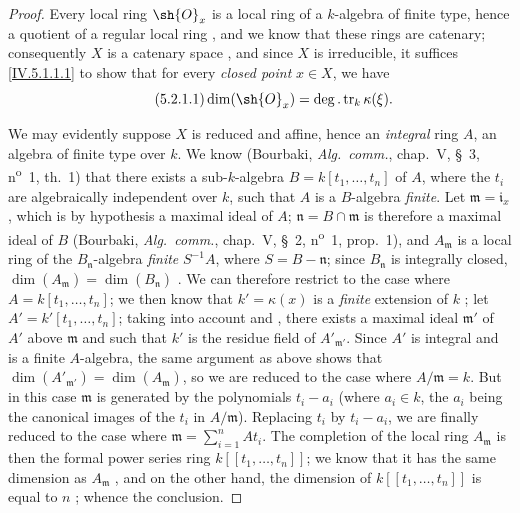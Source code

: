 \begin{proof}
Every local ring $\sh{O}_x$ is a local ring of a $k$-algebra of finite type, hence a quotient of a regular local ring , and we know  that these rings are catenary; consequently $X$ is a catenary space , and since $X$ is irreducible, it suffices \eqref{IV.5.1.1.1} to show that for every \emph{closed point} $x\in X$, we have
\[
\tag{5.2.1.1}\label{IV.5.2.1.1}
  \dim(\sh{O}_x) = \deg.\operatorname{tr}_k\kappa(\xi).
\]

We may evidently suppose $X$ is reduced and affine, hence an \emph{integral} ring $A$, an algebra of finite type over $k$.
We know (Bourbaki, \emph{Alg.\ comm.}, chap.~V, \S~3, n\textsuperscript{o}~1, th.~1) that there exists a sub-$k$-algebra $B=k[t_1,\ldots,t_n]$ of $A$, where the $t_i$ are algebraically independent over $k$, such that $A$ is a $B$-algebra \emph{finite}.
Let $\mathfrak{m}=\mathfrak{i}_x$, which is by hypothesis a maximal ideal of $A$; $\mathfrak{n}=B\cap\mathfrak{m}$ is therefore a maximal ideal of $B$ (Bourbaki, \emph{Alg.\ comm.}, chap.~V, \S~2, n\textsuperscript{o}~1, prop.~1), and $A_\mathfrak{m}$ is a local ring of the $B_\mathfrak{n}$-algebra \emph{finite} $S^{-1}A$, where $S=B-\mathfrak{n}$; since $B_\mathfrak{n}$ is integrally closed, $\dim(A_\mathfrak{m})=\dim(B_\mathfrak{n})$ .
We can therefore restrict to the case where $A=k[t_1,\ldots,t_n]$; we then know that $k'=\kappa(x)$ is a \emph{finite} extension of $k$ ; let $A'=k'[t_1,\ldots,t_n]$; taking into account  and , there exists a maximal ideal $\mathfrak{m}'$ of $A'$ above $\mathfrak{m}$ and such that $k'$ is the residue field of $A'_{\mathfrak{m}'}$.
Since $A'$ is integral and is a finite $A$-algebra, the same argument as above shows that $\dim(A'_{\mathfrak{m}'})=\dim(A_\mathfrak{m})$, so we are reduced to the case where $A/\mathfrak{m}=k$.
But in this case $\mathfrak{m}$ is generated by the polynomials $t_i-a_i$ (where $a_i\in k$, the $a_i$ being the canonical images of the $t_i$ in $A/\mathfrak{m}$).
Replacing $t_i$ by $t_i-a_i$, we are finally reduced to the case where $\mathfrak{m}=\sum_{i=1}^n At_i$.
The completion of the local ring $A_\mathfrak{m}$ is then the formal power series ring $k[[t_1,\ldots,t_n]]$; we know that it has the same dimension as $A_\mathfrak{m}$ , and on the other hand, the dimension of $k[[t_1,\ldots,t_n]]$ is equal to $n$ ; whence the conclusion.
\end{proof}

